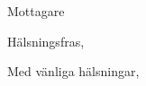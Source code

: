 \documentclass[a4paper]{letter}
\renewcommand{\ps}{P.S.~}
\begin{document}
\begin{letter}{Mottagare} 

    \opening{Hälsningsfras,}

    \lipsum[1-2]

    \closing{Med vänliga hälsningar,}



\end{letter}
\end{document}
